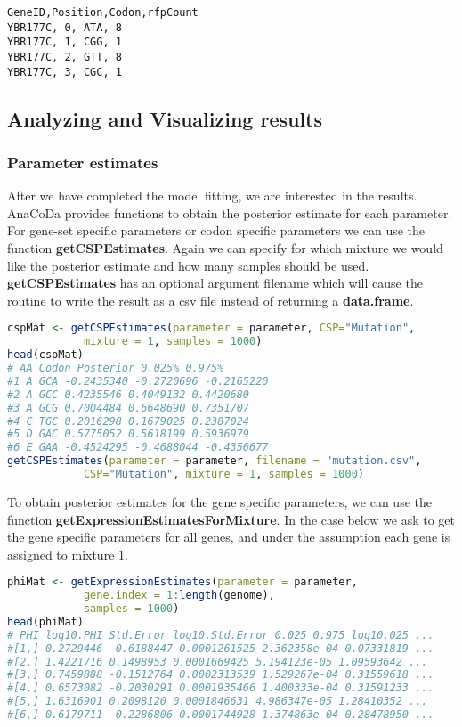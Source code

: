 \begin{verbatim}
GeneID,Position,Codon,rfpCount
YBR177C, 0, ATA, 8
YBR177C, 1, CGG, 1
YBR177C, 2, GTT, 8
YBR177C, 3, CGC, 1
\end{verbatim}

\subsection{Analyzing and Visualizing results}

\subsubsection{Parameter estimates}

After we have completed the model fitting, we are interested in the results. 
AnaCoDa provides functions to obtain the posterior estimate for each parameter. 
For gene-set specific parameters or codon specific parameters we can use the function \textbf{getCSPEstimates}. 
Again we can specify for which mixture we would like the posterior estimate and how many samples should be used. 
\textbf{getCSPEstimates} has an optional argument filename which will cause the routine to write the result as a csv file instead of returning a \textbf{data.frame}.

\begin{lstlisting}[language=R]
cspMat <- getCSPEstimates(parameter = parameter, CSP="Mutation", 
			mixture = 1, samples = 1000)
head(cspMat)
# AA Codon Posterior 0.025% 0.975%
#1 A GCA -0.2435340 -0.2720696 -0.2165220
#2 A GCC 0.4235546 0.4049132 0.4420680
#3 A GCG 0.7004484 0.6648690 0.7351707
#4 C TGC 0.2016298 0.1679025 0.2387024
#5 D GAC 0.5775052 0.5618199 0.5936979
#6 E GAA -0.4524295 -0.4688044 -0.4356677
getCSPEstimates(parameter = parameter, filename = "mutation.csv",
			CSP="Mutation", mixture = 1, samples = 1000)
\end{lstlisting}

To obtain posterior estimates for the gene specific parameters, we can use the function \textbf{getExpressionEstimatesForMixture}.
In the case below we ask to get the gene specific parameters for all genes, and under the assumption each gene is assigned to mixture $1$.

\begin{lstlisting}[language=R]
phiMat <- getExpressionEstimates(parameter = parameter,
			gene.index = 1:length(genome),
			samples = 1000)
head(phiMat)
# PHI log10.PHI Std.Error log10.Std.Error 0.025 0.975 log10.025 ...
#[1,] 0.2729446 -0.6188447 0.0001261525 2.362358e-04 0.07331819 ...
#[2,] 1.4221716 0.1498953 0.0001669425 5.194123e-05 1.09593642 ...
#[3,] 0.7459888 -0.1512764 0.0002313539 1.529267e-04 0.31559618 ...
#[4,] 0.6573082 -0.2030291 0.0001935466 1.400333e-04 0.31591233 ...
#[5,] 1.6316901 0.2098120 0.0001846631 4.986347e-05 1.28410352 ...
#[6,] 0.6179711 -0.2286806 0.0001744928 1.374863e-04 0.28478950 ...
\end{lstlisting}

